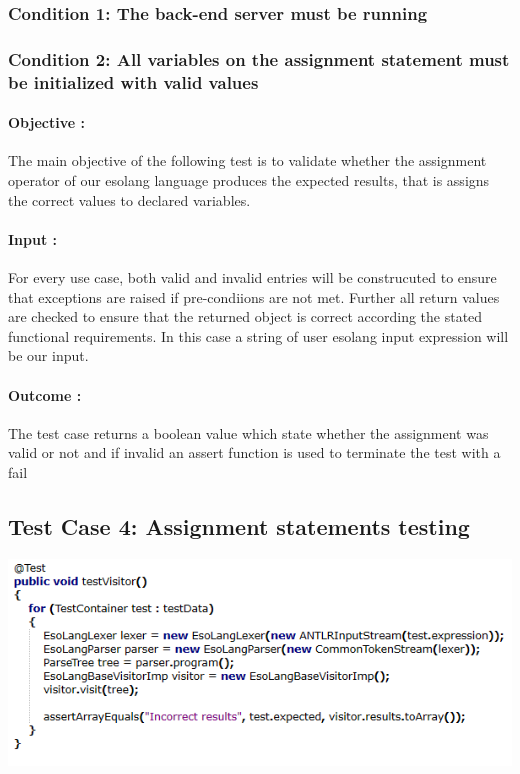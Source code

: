 \documentclass[english]{article}
\begin{document}
				\subsubsection{Condition 1: The back-end server must be running } 
				\subsubsection{Condition 2: All variables on the assignment statement must be initialized with valid values } 
				\paragraph{Objective :} The main objective of the following test is to validate whether the assignment operator of our esolang language produces the expected results, that is assigns the correct values to declared variables.
				\paragraph{Input :} For every use case, both valid and invalid entries will be construcuted to ensure that exceptions are raised if pre-condiions are not met. Further all return values are checked to ensure that the returned object is correct according the stated
				functional requirements. In this case a string of user  esolang input expression will be our input.
				
				\paragraph{Outcome :}The test case returns a boolean value which state whether the assignment was valid or not and if invalid an assert function is used to terminate the test with a fail\\
				
				\subsection{Test Case 4: Assignment statements testing} 
				\includegraphics[width=\linewidth]{wrong.png}
				
\end{document}
